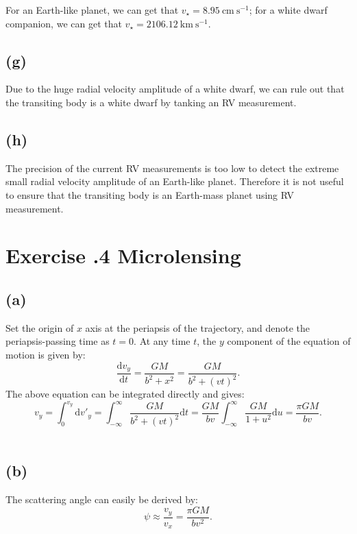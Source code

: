 \documentclass[a4paper,12pt]{article}
\begin{document}
For an Earth-like planet, we can get that $v_\star = 8.95 \ \text{cm} \ \text{s}^{-1}$;
for a white dwarf companion, we can get that $v_\star = 2106.12 \ \text{km}\  \text{s}^{-1}$.

\subsection*{(g)}
Due to the huge radial velocity amplitude of a white dwarf, we can rule out that 
the transiting body is a white dwarf by tanking an RV measurement.

\subsection*{(h)}
The precision of the current RV measurements is too low to detect 
the extreme small radial velocity amplitude of an Earth-like planet.
Therefore it is not useful to ensure that the transiting body is an Earth-mass planet using RV measurement.


\section*{\textbf{Exercise \uppercase\expandafter{}.4  Microlensing}}
\subsection*{(a)}
Set the origin of $x$ axis at the periapsis of the trajectory, and denote the periapsis-passing time as $t=0$. At any time $t$, the $y$ component of the equation of motion is given by:
\begin{equation}
    \frac{\mathrm{d}v_y}{\mathrm{d}t}=\frac{GM}{b^2+x^2}=\frac{GM}{b^2+(vt)^2}.
\end{equation}
The above equation can be integrated directly and gives:
\begin{equation}
        v_y=\int_0^{v_y}\mathrm{d}v'_y=\int_{-\infty}^\infty\frac{GM}{b^2+(vt)^2}\mathrm{d}t=\frac{GM}{bv}\int_{-\infty}^\infty\frac{GM}{1+u^2}\mathrm{d}u=\frac{\pi GM}{bv}.
\end{equation}\\

\subsection*{(b)}
The scattering angle can easily be derived by:
\begin{equation}
    \psi\approx\frac{v_y}{v_x}=\frac{\pi GM}{bv^2}.
\end{equation}
\end{document}
